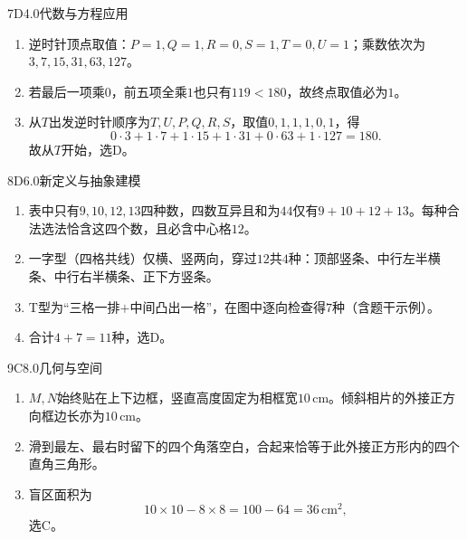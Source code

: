\begin{solution}{7}{D}{4.0}{代数与方程应用}
\begin{enumerate}[label=\textbf{Step \arabic*:},leftmargin=*]
  \item 逆时针顶点取值：\(P=1,Q=1,R=0,S=1,T=0,U=1\)；乘数依次为\(3,7,15,31,63,127\)。
  \item 若最后一项乘\(0\)，前五项全乘\(1\)也只有\(119<180\)，故终点取值必为\(1\)。
  \item 从\(T\)出发逆时针顺序为\(T,U,P,Q,R,S\)，取值\(0,1,1,1,0,1\)，得
  \[
    0\cdot3+1\cdot7+1\cdot15+1\cdot31+0\cdot63+1\cdot127=180.
  \]
  故从\(T\)开始，选D。
\end{enumerate}
\end{solution}

\begin{solution}{8}{D}{6.0}{新定义与抽象建模}
\begin{enumerate}[label=\textbf{Step \arabic*:},leftmargin=*]
  \item 表中只有\(9,10,12,13\)四种数，四数互异且和为\(44\)仅有\(9+10+12+13\)。每种合法选法恰含这四个数，且必含中心格\(12\)。
  \item 一字型（四格共线）仅横、竖两向，穿过\(12\)共\(4\)种：顶部竖条、中行左半横条、中行右半横条、正下方竖条。
  \item \(\mathrm{T}\)型为“三格一排\(+\)中间凸出一格”，在图中逐向检查得\(7\)种（含题干示例）。
  \item 合计\(4+7=11\)种，选D。
\end{enumerate}
\end{solution}

\begin{solution}{9}{C}{8.0}{几何与空间}
\begin{enumerate}[label=\textbf{Step \arabic*:},leftmargin=*]
  \item \(M,N\)始终贴在上下边框，竖直高度固定为相框宽\(10\,\mathrm{cm}\)。倾斜相片的外接正方向框边长亦为\(10\,\mathrm{cm}\)。
  \item 滑到最左、最右时留下的四个角落空白，合起来恰等于此外接正方形内的四个直角三角形。
  \item 盲区面积为
  \[
    10\times10-8\times8=100-64=36\,\mathrm{cm}^2,
  \]
  选C。
\end{enumerate}
\end{solution}

